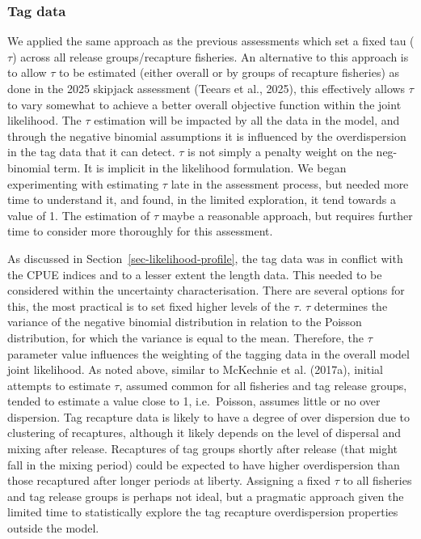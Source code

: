 \documentclass[
  english,
  a4paper,
  a4paper,
  11pt]{SCreport}
\begin{document}
\subsubsection{Tag data}\label{sec-tagdata-likelihood}

We applied the same approach as the previous assessments which set a
fixed tau (\(\tau\)) across all release groups/recapture fisheries. An
alternative to this approach is to allow \(\tau\) to be estimated
(either overall or by groups of recapture fisheries) as done in the 2025
skipjack assessment (Teears et al., 2025), this effectively allows
\(\tau\) to vary somewhat to achieve a better overall objective function
within the joint likelihood. The \(\tau\) estimation will be impacted by
all the data in the model, and through the negative binomial assumptions
it is influenced by the overdispersion in the tag data that it can
detect. \(\tau\) is not simply a penalty weight on the neg-binomial
term. It is implicit in the likelihood formulation. We began
experimenting with estimating \(\tau\) late in the assessment process,
but needed more time to understand it, and found, in the limited
exploration, it tend towards a value of 1. The estimation of \(\tau\)
maybe a reasonable approach, but requires further time to consider more
thoroughly for this assessment.

As discussed in Section~\ref{sec-likelihood-profile}, the tag data was
in conflict with the CPUE indices and to a lesser extent the length
data. This needed to be considered within the uncertainty
characterisation. There are several options for this, the most practical
is to set fixed higher levels of the \(\tau\). \(\tau\) determines the
variance of the negative binomial distribution in relation to the
Poisson distribution, for which the variance is equal to the mean.
Therefore, the \(\tau\) parameter value influences the weighting of the
tagging data in the overall model joint likelihood. As noted above,
similar to McKechnie et al. (2017a), initial attempts to estimate
\(\tau\), assumed common for all fisheries and tag release groups,
tended to estimate a value close to 1, i.e.~Poisson, assumes little or
no over dispersion. Tag recapture data is likely to have a degree of
over dispersion due to clustering of recaptures, although it likely
depends on the level of dispersal and mixing after release. Recaptures
of tag groups shortly after release (that might fall in the mixing
period) could be expected to have higher overdispersion than those
recaptured after longer periods at liberty. Assigning a fixed \(\tau\)
to all fisheries and tag release groups is perhaps not ideal, but a
pragmatic approach given the limited time to statistically explore the
tag recapture overdispersion properties outside the model.
\end{document}
